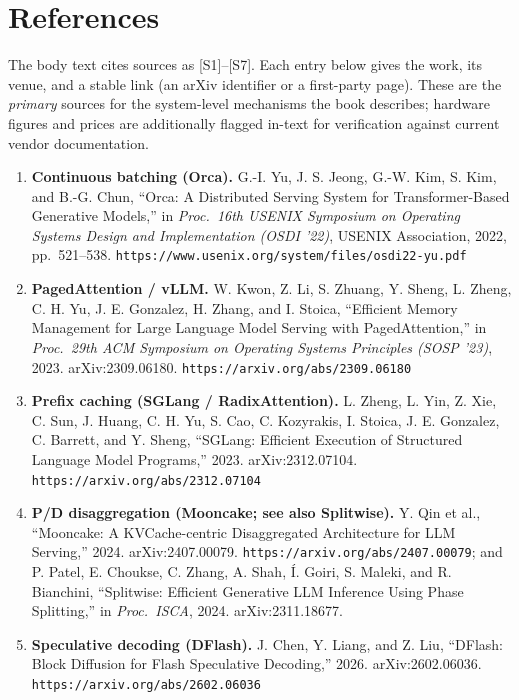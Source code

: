 \chapter{References}
\label{chap:references}

\noindent The body text cites sources as \textsc{[S1]}–\textsc{[S7]}. Each entry below gives the work, its venue, and a stable link (an arXiv identifier or a first-party page). These are the \emph{primary} sources for the system-level mechanisms the book describes; hardware figures and prices are additionally flagged in-text for verification against current vendor documentation.

\begin{enumerate}\tightlist
\item \textbf{Continuous batching (Orca).} G.-I. Yu, J. S. Jeong, G.-W. Kim, S. Kim, and B.-G. Chun, ``Orca: A Distributed Serving System for Transformer-Based Generative Models,'' in \emph{Proc.\ 16th USENIX Symposium on Operating Systems Design and Implementation (OSDI '22)}, USENIX Association, 2022, pp.\ 521--538. \texttt{https://www.usenix.org/system/files/osdi22-yu.pdf}
\item \textbf{PagedAttention / vLLM.} W. Kwon, Z. Li, S. Zhuang, Y. Sheng, L. Zheng, C. H. Yu, J. E. Gonzalez, H. Zhang, and I. Stoica, ``Efficient Memory Management for Large Language Model Serving with PagedAttention,'' in \emph{Proc.\ 29th ACM Symposium on Operating Systems Principles (SOSP '23)}, 2023. arXiv:2309.06180. \texttt{https://arxiv.org/abs/2309.06180}
\item \textbf{Prefix caching (SGLang / RadixAttention).} L. Zheng, L. Yin, Z. Xie, C. Sun, J. Huang, C. H. Yu, S. Cao, C. Kozyrakis, I. Stoica, J. E. Gonzalez, C. Barrett, and Y. Sheng, ``SGLang: Efficient Execution of Structured Language Model Programs,'' 2023. arXiv:2312.07104. \texttt{https://arxiv.org/abs/2312.07104}
\item \textbf{P/D disaggregation (Mooncake; see also Splitwise).} Y. Qin et al., ``Mooncake: A KVCache-centric Disaggregated Architecture for LLM Serving,'' 2024. arXiv:2407.00079. \texttt{https://arxiv.org/abs/2407.00079}; and P. Patel, E. Choukse, C. Zhang, A. Shah, \'{I}. Goiri, S. Maleki, and R. Bianchini, ``Splitwise: Efficient Generative LLM Inference Using Phase Splitting,'' in \emph{Proc.\ ISCA}, 2024. arXiv:2311.18677.
\item \textbf{Speculative decoding (DFlash).} J. Chen, Y. Liang, and Z. Liu, ``DFlash: Block Diffusion for Flash Speculative Decoding,'' 2026. arXiv:2602.06036. \texttt{https://arxiv.org/abs/2602.06036}

\end{enumerate}
